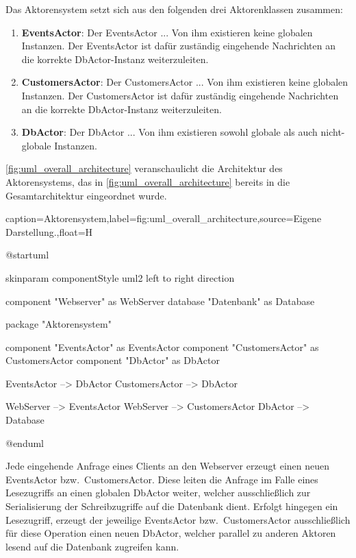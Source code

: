 Das Aktorensystem setzt sich aus den folgenden drei Aktorenklassen zusammen:
\begin{enumerate}
    \item \textbf{EventsActor}: Der EventsActor ... Von ihm existieren keine globalen Instanzen. Der EventsActor ist dafür zuständig eingehende Nachrichten an die korrekte DbActor-Instanz weiterzuleiten.
    \item \textbf{CustomersActor}: Der CustomersActor ... Von ihm existieren keine globalen Instanzen. Der CustomersActor ist dafür zuständig eingehende Nachrichten an die korrekte DbActor-Instanz weiterzuleiten.
    \item \textbf{DbActor}: Der DbActor ... Von ihm existieren sowohl globale als auch nicht-globale Instanzen.
\end{enumerate}

\autoref{fig:uml_overall_architecture} veranschaulicht die Architektur des Aktorensystems, das in \autoref{fig:uml_overall_architecture} bereits in die Gesamtarchitektur eingeordnet wurde.

\begin{dhbwfigure}{caption=Aktorensystem,label=fig:uml_overall_architecture,source={Eigene Darstellung.},float=H}
    \begin{plantuml}
        @startuml

            skinparam componentStyle uml2
            left to right direction

            component "Webserver" as WebServer
            database "Datenbank" as Database

            package "Aktorensystem" {
                component "EventsActor" as EventsActor
                component "CustomersActor" as CustomersActor
                component "DbActor" as DbActor

                
                EventsActor --> DbActor
                CustomersActor --> DbActor
            }

            WebServer --> EventsActor
            WebServer --> CustomersActor
            DbActor --> Database

        @enduml
    \end{plantuml}
\end{dhbwfigure}\unskip

Jede eingehende Anfrage eines Clients an den Webserver erzeugt einen neuen EventsActor bzw.\ CustomersActor.
Diese leiten die Anfrage im Falle eines Lesezugriffs an einen globalen DbActor weiter, welcher ausschließlich zur Serialisierung der Schreibzugriffe auf die Datenbank dient.
Erfolgt hingegen ein Lesezugriff, erzeugt der jeweilige EventsActor bzw.\ CustomersActor ausschließlich für diese Operation einen neuen DbActor, welcher parallel zu anderen Aktoren lesend auf die Datenbank zugreifen kann.
